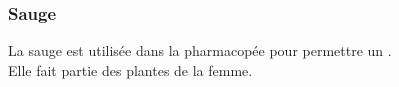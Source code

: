 \subsubsection{Sauge}

La sauge est utilisée dans la pharmacopée pour permettre un . \\
Elle fait partie des plantes de la femme.


